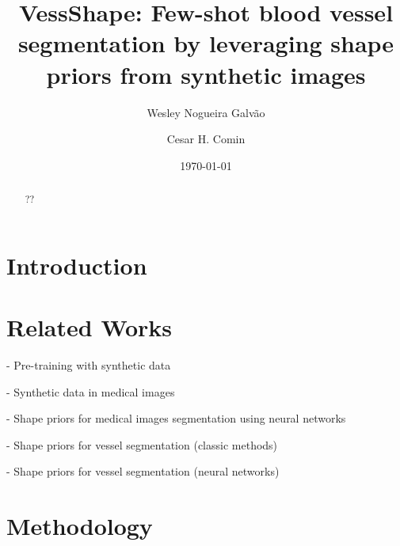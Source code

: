 \documentclass[%
reprint,
nofootinbib,
 amsmath,amssymb,
aps,
superscriptaddress,
showkeys,
longbibliography
]{revtex4-1}
\begin{document}



\title{VessShape: Few-shot blood vessel segmentation by leveraging shape priors from synthetic images}

\author{Wesley Nogueira Galvão}


\author{Cesar H. Comin}

\date{\today}%

\begin{abstract}

??

\end{abstract}


\maketitle
\thispagestyle{plain}

\section{Introduction}
\label{sec:introduction}



\section{Related Works}
\label{sec:related}

- Pre-training with synthetic data

- Synthetic data in medical images

- Shape priors for medical images segmentation using neural networks

- Shape priors for vessel segmentation (classic methods)

- Shape priors for vessel segmentation (neural networks)

\section{Methodology}
\label{s:methodology}
\end{document}
